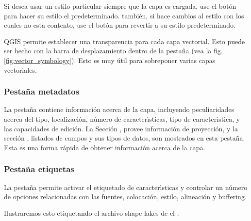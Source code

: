 Si desea usar un estilo particular siempre que la capa es cargada, 
use el bot\'on  para hacer su estilo el predeterminado. también, 
si hace cambios al estilo con los cuales no esta contento, use el bot\'on  para revertir a su estilo predeterminado.

 \label{sec:vect_transparency} 
QGIS \CURRENT permite establecer una transparencia para cada capa vectorial. Esto puede ser hecho con
la barra de desplazamiento  dentro de la pesta\~na  (vea la fig. \ref{fig:vector_symbology}).
Esto es muy \'util para sobreponer varias capas vectoriales.

\subsubsection{Pesta\~na metadatos}

La pesta\~na  contiene informaci\'on acerca de la capa, incluyendo peculiaridades
acerca del tipo, localizaci\'on, n\'umero de caracter\'{\i}sticas, tipo de caracter\'{\i}stica, y las capacidades de edici\'on.
La Secci\'on , provee 
informaci\'on de proyecci\'on, y la secci\'on ,
listados de campos y sus tipos de datos, son mostrados en esta pesta\~na. Esta es una forma r\'apida de obtener informaci\'on acerca de la capa.

\subsubsection{Pesta\~na etiquetas}

La pesta\~na  permite activar el etiquetado de caracter\'{\i}sticas y controlar un n\'umero de opciones
relacionadas con las fuentes, colocaci\'on, estilo, alineaci\'on y buffering.

Ilustraremos esto etiquetando el archivo shape lakes de el 
:

